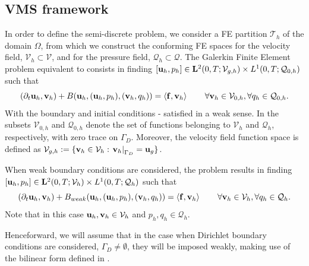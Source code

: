 \subsection{VMS framework}
In order to define the semi-discrete problem, we consider a FE partition $ \mathcal{T}_h $ of the domain $ \Omega $, from which we construct the conforming FE spaces for the velocity field, $ \mathcal{V}_h\subset\mathcal{V} $, and for the pressure field, $ \mathcal{Q}_h\subset\mathcal{Q} $. The Galerkin Finite Element problem equivalent to  consists in finding $[{\bf u}_h,p_h]\in\mathbf{L}^2(0,T;\mathcal{V}_{g,h})\times L^1(0,T;\mathcal{Q}_{0,h})$ such that
\begin{equation}
\label{eq-C7_NS_galerkin}
(\partial_t{\bf u}_h,{\bf v}_h)+B({\bf u}_h,({\bf u}_h,p_h),({\bf v}_h,q_h)) =\left<{\bf f},{\bf v}_h\right>
\quad\quad\forall{\bf v}_h\in\mathcal{V}_{0,h},\forall q_h\in\mathcal{Q}_{0,h}.
\end{equation}
With the boundary and initial conditions - satisfied in a weak sense. In  the subsets $ \mathcal{V}_{0,h} $ and $ \mathcal{Q}_{0,h} $ denote the set of functions belonging to $ \mathcal{V}_h $ and $ \mathcal{Q}_h $, respectively, with zero trace on $ \Gamma_D $. Moreover, the velocity field function space is defined as $ \mathcal{V}_{g,h}:=\lbrace{\bf v}_h\in\mathcal{V}_h: \left.{\bf v}_h\right|_{\Gamma_D}={\bf u}_g\rbrace $.

When weak boundary conditions are considered, the problem results in finding $[{\bf u}_h,p_h]\in\mathbf{L}^2(0,T;\mathcal{V}_{h})\times L^1(0,T;\mathcal{Q}_{h})$ such that
\begin{equation}
\label{eq-C7_NS_galerkin_weak}
(\partial_t{\bf u}_h,{\bf v}_h)+B_{weak}({\bf u}_h,({\bf u}_h,p_h),({\bf v}_h,q_h)) =\left<{\bf f},{\bf v}_h\right>
\quad\quad\forall{\bf v}_h\in\mathcal{V}_{h},\forall q_h\in\mathcal{Q}_{h}.
\end{equation}
Note that in this case $ {\bf u}_h,{\bf v}_h\in\mathcal{V}_h $ and $ p_h,q_h\in\mathcal{Q}_h $.

Henceforward, we will assume that in the case when Dirichlet boundary conditions are considered, $ \Gamma_D\neq \emptyset $, they will be imposed weakly, making use of the bilinear form defined in .

